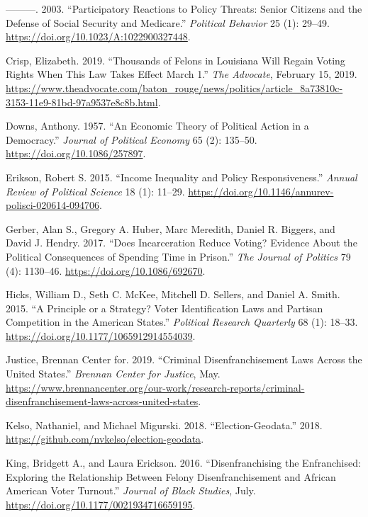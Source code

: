 \documentclass[
  12pt,
]{article}
\newlength{\cslhangindent}
\newenvironment{cslreferences}%
  {\setlength{\parindent}{0pt}%
  \everypar{\setlength{\hangindent}{\cslhangindent}}\ignorespaces}%
  {\par}
\begin{document}
\begin{cslreferences}
\leavevmode\hypertarget{ref-Campbell2003}{}%
---------. 2003. ``Participatory Reactions to Policy Threats: Senior Citizens and the Defense of Social Security and Medicare.'' \emph{Political Behavior} 25 (1): 29--49. \url{https://doi.org/10.1023/A:1022900327448}.

\leavevmode\hypertarget{ref-Crisp2019}{}%
Crisp, Elizabeth. 2019. ``Thousands of Felons in Louisiana Will Regain Voting Rights When This Law Takes Effect March 1.'' \emph{The Advocate}, February 15, 2019. \url{https://www.theadvocate.com/baton_rouge/news/politics/article_8a73810c-3153-11e9-81bd-97a9537e8c8b.html}.

\leavevmode\hypertarget{ref-Downs1957}{}%
Downs, Anthony. 1957. ``An Economic Theory of Political Action in a Democracy.'' \emph{Journal of Political Economy} 65 (2): 135--50. \url{https://doi.org/10.1086/257897}.

\leavevmode\hypertarget{ref-Erikson2015}{}%
Erikson, Robert S. 2015. ``Income Inequality and Policy Responsiveness.'' \emph{Annual Review of Political Science} 18 (1): 11--29. \url{https://doi.org/10.1146/annurev-polisci-020614-094706}.

\leavevmode\hypertarget{ref-Gerber2017}{}%
Gerber, Alan S., Gregory A. Huber, Marc Meredith, Daniel R. Biggers, and David J. Hendry. 2017. ``Does Incarceration Reduce Voting? Evidence About the Political Consequences of Spending Time in Prison.'' \emph{The Journal of Politics} 79 (4): 1130--46. \url{https://doi.org/10.1086/692670}.

\leavevmode\hypertarget{ref-Hicks2015}{}%
Hicks, William D., Seth C. McKee, Mitchell D. Sellers, and Daniel A. Smith. 2015. ``A Principle or a Strategy? Voter Identification Laws and Partisan Competition in the American States.'' \emph{Political Research Quarterly} 68 (1): 18--33. \url{https://doi.org/10.1177/1065912914554039}.

\leavevmode\hypertarget{ref-bcj_laws}{}%
Justice, Brennan Center for. 2019. ``Criminal Disenfranchisement Laws Across the United States.'' \emph{Brennan Center for Justice}, May. \url{https://www.brennancenter.org/our-work/research-reports/criminal-disenfranchisement-laws-across-united-states}.

\leavevmode\hypertarget{ref-Kelso2018}{}%
Kelso, Nathaniel, and Michael Migurski. 2018. ``Election-Geodata.'' 2018. \url{https://github.com/nvkelso/election-geodata}.

\leavevmode\hypertarget{ref-King2016}{}%
King, Bridgett A., and Laura Erickson. 2016. ``Disenfranchising the Enfranchised: Exploring the Relationship Between Felony Disenfranchisement and African American Voter Turnout.'' \emph{Journal of Black Studies}, July. \url{https://doi.org/10.1177/0021934716659195}.


\end{cslreferences}
\end{document}
